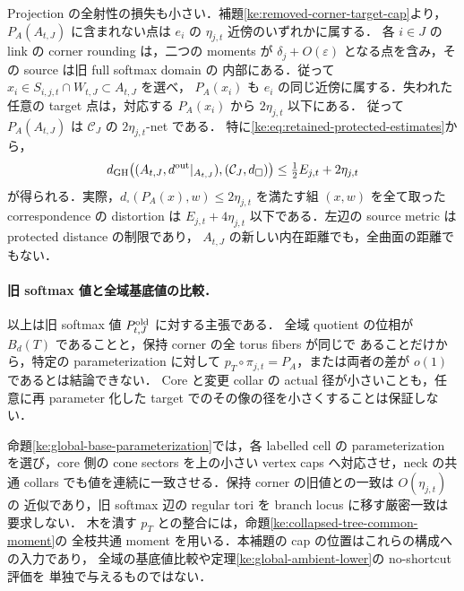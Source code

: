 Projection の全射性の損失も小さい．補題\ref{ke:removed-corner-target-cap}より，
$P_A(A_{t,J})$ に含まれない点は $e_i$ の $\eta_{j,t}$ 近傍のいずれかに属する．
各 $i\in J$ の link の corner rounding は，二つの moments が
$\delta_j+O(\varepsilon)$ となる点を含み，その source は旧 full softmax domain の
内部にある．従って
$x_i\in S_{i,j,t}\cap W_{t,J}\subset A_{t,J}$ を選べ，
$P_A(x_i)$ も $e_i$ の同じ近傍に属する．失われた任意の target 点は，対応する
$P_A(x_i)$ から $2\eta_{j,t}$ 以下にある．
従って $P_A(A_{t,J})$ は $\mathcal C_J$ の $2\eta_{j,t}$-net である．
特に\eqref{ke:eq:retained-protected-estimates}から，
\[
 d_{\rm GH}\bigl((A_{t,J},d^{\rm out}|_{A_{t,J}}),
                  (\mathcal C_J,d_\square)\bigr)
 \le \tfrac12E_{j,t}+2\eta_{j,t}
\]
が得られる．実際，$d_\square(P_A(x),w)\le2\eta_{j,t}$ を満たす組
$(x,w)$ を全て取った correspondence の distortion は
$E_{j,t}+4\eta_{j,t}$ 以下である．左辺の source metric は protected distance の制限であり，
$A_{t,J}$ の新しい内在距離でも，全曲面の距離でもない．

\paragraph{旧 softmax 値と全域基底値の比較．}
以上は旧 softmax 値 $P^{\rm old}_{t,J}$ に対する主張である．
全域 quotient の位相が $B_d(T)$ であることと，保持 corner の全 torus fibers が同じで
あることだけから，特定の parameterization に対して
$p_T\circ\pi_{j,t}=P_A$，または両者の差が $o(1)$ であるとは結論できない．
Core と変更 collar の actual 径が小さいことも，任意に再 parameter 化した target
でのその像の径を小さくすることは保証しない．

命題\ref{ke:global-base-parameterization}では，各 labelled cell の parameterization
を選び，core 側の cone sectors を上の小さい vertex caps へ対応させ，neck の共通
collars でも値を連続に一致させる．保持 corner の旧値との一致は $O(\eta_{j,t})$ の
近似であり，旧 softmax 辺の regular tori を branch locus に移す厳密一致は要求しない．
木を潰す $p_T$ との整合には，命題\ref{ke:collapsed-tree-common-moment}の
全枝共通 moment を用いる．本補題の cap の位置はこれらの構成への入力であり，
全域の基底値比較や定理\ref{ke:global-ambient-lower}の no-shortcut 評価を
単独で与えるものではない．
